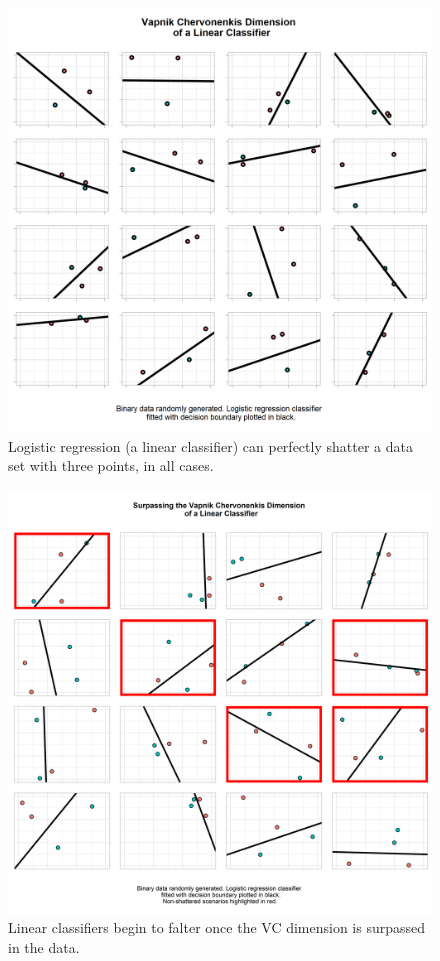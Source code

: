 \begin{figure}[H]
    \centering
    \includegraphics[width=120mm]{figs/vc_3.png}
    \caption{Logistic regression (a linear classifier) can perfectly shatter a data set with three points, in all cases.}
    \label{fig:vc_3}
\end{figure}

\begin{figure}[H]
    \centering
    \includegraphics[width=120mm]{figs/vc_4.png}
    \caption{Linear classifiers begin to falter once the VC dimension is surpassed in the data.}
    \label{fig:vc_3}
\end{figure}

